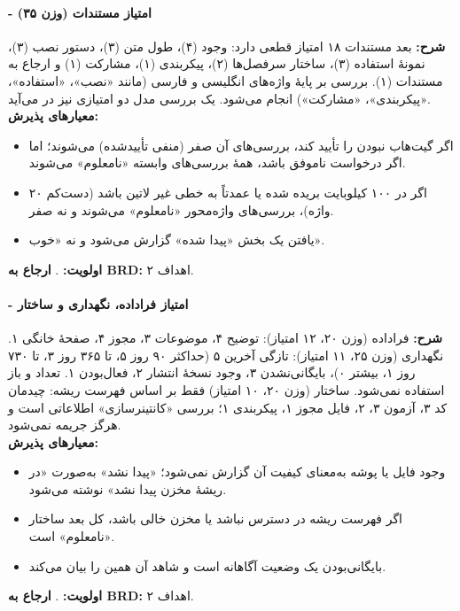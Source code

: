 \documentclass[12pt]{article}
\begin{document}
 \paragraph{ - امتیاز مستندات (وزن ۳۵)}
\textbf{شرح:} بعد مستندات ۱۸ امتیاز قطعی دارد: وجود  (۴)، طول متن (۳)، دستور نصب (۳)، نمونهٔ استفاده (۳)، ساختار سرفصل‌ها (۲)، پیکربندی (۱)، مشارکت (۱) و ارجاع به مستندات (۱). بررسی بر پایهٔ واژه‌های انگلیسی و فارسی (مانند «نصب»، «استفاده»، «پیکربندی»، «مشارکت») انجام می‌شود. یک بررسی مدل دو امتیازی نیز در \textbf{} می‌آید.
\\
\textbf{معیارهای پذیرش:}
\begin{itemize}
\item اگر گیت‌هاب نبودن  را تأیید کند، بررسی‌های آن صفر (منفی تأییدشده) می‌شوند؛ اما اگر درخواست ناموفق باشد، همهٔ بررسی‌های وابسته «نامعلوم» می‌شوند.
\item اگر  در ۱۰۰ کیلوبایت بریده شده یا عمدتاً به خطی غیر لاتین باشد (دست‌کم ۲۰ واژه)، بررسی‌های واژه‌محور «نامعلوم» می‌شوند و نه صفر.
\item یافتن یک بخش «پیدا شده» گزارش می‌شود و نه «خوب».
\end{itemize}
\textbf{اولویت:} . \textbf{ارجاع به BRD:} اهداف ۲.
 \paragraph{ - امتیاز فراداده، نگهداری و ساختار}
\textbf{شرح:} فراداده (وزن ۲۰، ۱۲ امتیاز): توضیح ۴، موضوعات ۳، مجوز ۴، صفحهٔ خانگی ۱. نگهداری (وزن ۲۵، ۱۱ امتیاز): تازگی آخرین  ۵ (حداکثر ۹۰ روز ۵، تا ۳۶۵ روز ۳، تا ۷۳۰ روز ۱، بیشتر ۰)، بایگانی‌نشدن ۳، وجود نسخهٔ انتشار ۲، فعال‌بودن  ۱. تعداد  و  باز استفاده نمی‌شود. ساختار (وزن ۲۰، ۱۰ امتیاز) فقط بر اساس فهرست ریشه: چیدمان کد ۳، آزمون ۳،  ۲، فایل مجوز ۱، پیکربندی  ۱؛ بررسی «کانتینرسازی» اطلاعاتی است و هرگز جریمه نمی‌شود.
\\
\textbf{معیارهای پذیرش:}
\begin{itemize}
\item وجود فایل یا پوشه به‌معنای کیفیت آن گزارش نمی‌شود؛ «پیدا نشد» به‌صورت «در ریشهٔ مخزن پیدا نشد» نوشته می‌شود.
\item اگر فهرست ریشه در دسترس نباشد یا مخزن خالی باشد، کل بعد ساختار «نامعلوم» است.
\item بایگانی‌بودن یک وضعیت آگاهانه است و شاهد آن همین را بیان می‌کند.
\end{itemize}
\textbf{اولویت:} . \textbf{ارجاع به BRD:} اهداف ۲.
\end{document}
